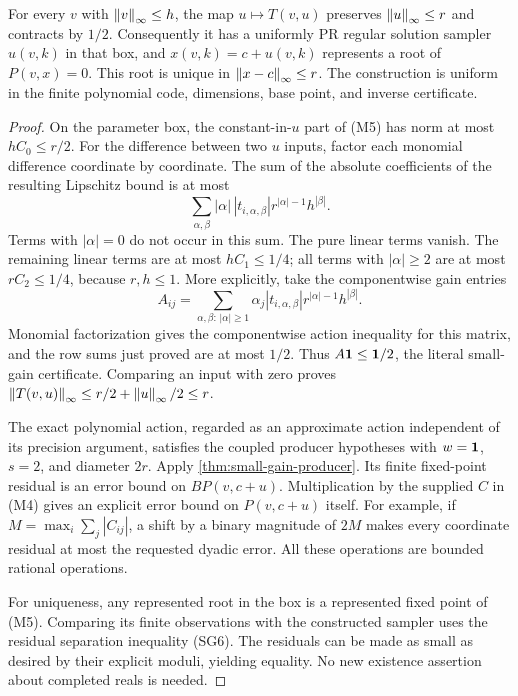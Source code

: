 \begin{theorem}
\label{thm:chart}
For every \(v\) with \(\left\lVert v\right\rVert_\infty\le h\), the map
\(u\mapsto T(v,u)\) preserves \(\left\lVert u\right\rVert_\infty\le r\) and
contracts by \(1/2\). Consequently it has a uniformly PR regular
solution sampler \(u(v,k)\) in that box, and
\(x(v,k)=c+u(v,k)\) represents a root of \(P(v,x)=0\).
This root is unique in \(\left\lVert x-c\right\rVert_\infty\le r\).
The construction is uniform in the finite polynomial code, dimensions,
base point, and inverse certificate.
\end{theorem}
\begin{proof}
On the parameter box, the constant-in-\(u\) part of (M5) has
norm at most \(hC_0\le r/2\). For the difference between two
\(u\) inputs, factor each monomial difference coordinate by
coordinate. The sum of the absolute coefficients of the resulting
Lipschitz bound is at most
\[
 \sum_{\alpha,\beta}|\alpha|\,
 |t_{i,\alpha,\beta}|r^{|\alpha|-1}h^{|\beta|}.
\]
Terms with \(|\alpha|=0\) do not occur in this sum. The pure
linear terms vanish. The remaining linear terms are at most
\(hC_1\le1/4\); all terms with \(|\alpha|\ge2\) are at
most \(rC_2\le1/4\), because \(r,h\le1\).
More explicitly, take the componentwise gain entries
\[
 A_{ij}=\sum_{\alpha,\beta:\,|\alpha|\ge1}
 \alpha_j |t_{i,\alpha,\beta}|
 r^{|\alpha|-1}h^{|\beta|}.
\]
Monomial factorization gives the componentwise action inequality for
this matrix, and the row sums just proved are at most \(1/2\).
Thus \(A\mathbf 1\le\mathbf 1/2\), the literal small-gain certificate.
Comparing an input with zero proves
\(\left\lVert T(v,u)\right\rVert_\infty\le r/2+\left\lVert u\right\rVert_\infty/2\le r\).

The exact polynomial action, regarded as an approximate action
independent of its precision argument, satisfies the coupled
producer hypotheses with \(w=\mathbf 1\), \(s=2\), and diameter
\(2r\). Apply \cref{thm:small-gain-producer}. Its finite
fixed-point residual is an error bound on \(BP(v,c+u)\).
Multiplication by the supplied \(C\) in (M4) gives an explicit
error bound on \(P(v,c+u)\) itself. For example, if
\(M=\max_i\sum_j|C_{ij}|\), a shift by a binary magnitude
of \(2M\) makes every coordinate residual at most the requested
dyadic error. All these operations are bounded rational operations.

For uniqueness, any represented root in the box is a represented
fixed point of (M5). Comparing its finite observations with the
constructed sampler uses the residual separation inequality (SG6).
The residuals can be made as small as desired by their explicit
moduli, yielding equality. No new existence assertion about
completed reals is needed.
\end{proof}

